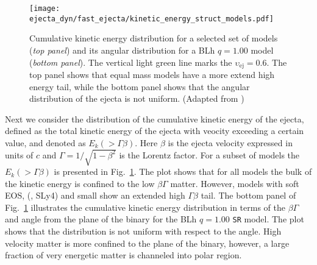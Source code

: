\begin{figure}%
    \centering 
    \texttt{[image: ejecta\_dyn/fast\_ejecta/kinetic\_energy\_struct\_models.pdf]}
    \caption{
        Cumulative kinetic energy distribution for a selected set of models (\textit{top panel}) 
        and its angular distribution for a BLh $q=1.00$ model (\textit{bottom panel}).
        The vertical light green line marks the $\upsilon_{\text{ej}}=0.6$.
        The top panel shows that equal mass models have a more extend high energy tail,
        while the bottom panel shows that the angular distribution of the ejecta is not 
        uniform.
        (Adapted from \citet{Nedora:2021eoj})
    } 
    \label{fig:ejecta_vel_hist}
\end{figure}


%
Next we consider the distribution of the cumulative kinetic energy of the ejecta,
defined as the total kinetic energy of the ejecta with veocity exceeding 
a certain value, and denoted as $E_k(>\Gamma\beta)$.
Here $\beta$ is the ejecta velocity expressed in units of $c$ and 
$\Gamma = 1/\sqrt{1-\beta^2}$ is the Lorentz factor.
%
For a subset of models the $E_k(>\Gamma\beta)$ is presented in Fig.~\ref{fig:ejecta_vel_hist}. 
%
The plot shows that for all models the bulk of the kinetic energy is confined to 
the low $\beta\Gamma$ matter.
However, models with soft \ac{EOS}, (\eg, SLy4) and small \mr{} show an
extended high $\Gamma\beta$ tail.
The bottom panel of Fig.~\ref{fig:ejecta_vel_hist} illustrates the 
cumulative kinetic energy distribution in terms of the $\beta \Gamma$ and angle 
from the plane of the binary for the 
BLh $q=1.00$ \texttt{SR} model.
The plot shows that the distribution is not uniform with respect to the angle.
High velocity matter is more confined to the plane of the binary, however,
a large fraction of very energetic matter is channeled into polar region. 

